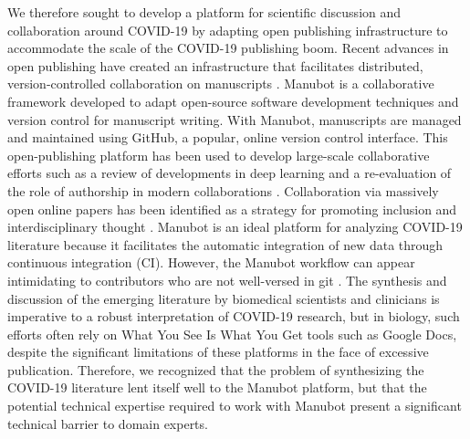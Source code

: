 \documentclass[sigconf]{acmart}
\begin{document}
We therefore sought to develop a platform for scientific discussion and collaboration around COVID-19 by adapting open publishing infrastructure to accommodate the scale of the COVID-19 publishing boom.
Recent advances in open publishing have created an infrastructure that facilitates distributed, version-controlled collaboration on manuscripts \citep{YuJbg3zO}.
Manubot \citep{YuJbg3zO} is a collaborative framework developed to adapt open-source software development techniques and version control for manuscript writing.
With Manubot, manuscripts are managed and maintained using GitHub, a popular, online version control interface.
This open-publishing platform has been used to develop large-scale collaborative efforts such as a review of developments in deep learning \citep{PZMP42Ak} and a re-evaluation of the role of authorship in modern collaborations \citep{6acsZuy7}.
Collaboration via massively open online papers has been identified as a strategy for promoting inclusion and interdisciplinary thought \citep{PoDz2q0A}.
Manubot is an ideal platform for analyzing COVID-19 literature because it facilitates the automatic integration of new data through continuous integration (CI).
However, the Manubot workflow can appear intimidating to contributors who are not well-versed in git \citep{PoDz2q0A}.
The synthesis and discussion of the emerging literature by biomedical scientists and clinicians is imperative to a robust interpretation of COVID-19 research, but in biology, such efforts often rely on What You See Is What You Get tools such as Google Docs, despite the significant limitations of these platforms in the face of excessive publication.
Therefore, we recognized that the problem of synthesizing the COVID-19 literature lent itself well to the Manubot platform, but that the potential technical expertise required to work with Manubot present a significant technical barrier to domain experts.
\end{document}
